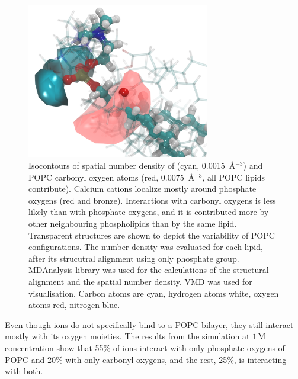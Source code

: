 \documentclass[aip,jcp,twocolumn]{revtex4}
\begin{document}
\begin{figure}[tb!]
  \centering
  \includegraphics[width=8.0cm]{../Fig/isocontours_r37_ca_O-carb.png} %
  \caption{\label{fig:volmaps}
      Isocontours of spatial number density of  (cyan, 0.0015~\AA$^{-3}$) 
      and POPC carbonyl oxygen atoms (red, 0.0075~\AA$^{-3}$, all POPC lipids contribute). 
      Calcium cations localize mostly around phosphate oxygens (red and bronze).
      Interactions with carbonyl oxygens is less likely than with phosphate oxygens, 
      and it is contributed more by other neighbouring phospholipids than by the same lipid. 
      Transparent structures are shown to depict the variability of POPC configurations. 
      The number density was evaluated for each lipid, 
      after its strucutral alignment using only phosphate group. 
      MDAnalysis \cite{mdanalysis2011} library was used for 
      the calculations of the structural alignment and the spatial number density. 
      VMD \cite{hump96} was used for visualisation. 
      Carbon atoms are cyan, hydrogen atoms white, oxygen atoms red, nitrogen blue.
  }
\end{figure}

Even though  ions do not specifically bind to a POPC bilayer, they still interact mostly with its oxygen moieties. The results from the simulation at $1\,$M  concentration show that 55\% of  ions interact with only phosphate oxygens of POPC and 20\% with only carbonyl oxygens, and the rest, 25\%, is interacting with both.
\end{document}
